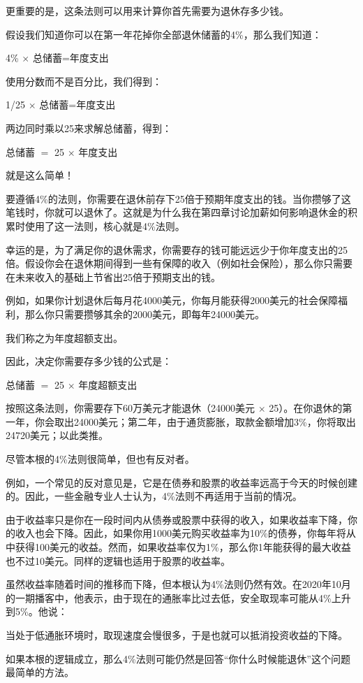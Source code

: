 更重要的是，这条法则可以用来计算你首先需要为退休存多少钱。

假设我们知道你可以在第一年花掉你全部退休储蓄的4\%，那么我们知道：

4\% $\times$ 总储蓄=年度支出

使用分数而不是百分比，我们得到：

1/25 $\times$ 总储蓄=年度支出

两边同时乘以25来求解总储蓄，得到：

总储蓄 $=$ 25 $\times$ 年度支出

就是这么简单！

要遵循4\%的法则，你需要在退休前存下25倍于预期年度支出的钱。当你攒够了这笔钱时，你就可以退休了。这就是为什么我在第四章讨论加薪如何影响退休金的积累时使用了这一法则，核心就是4\%法则。

幸运的是，为了满足你的退休需求，你需要存的钱可能远远少于你年度支出的25倍。假设你会在退休期间得到一些有保障的收入（例如社会保险），那么你只需要在未来收入的基础上节省出25倍于预期支出的钱。

例如，如果你计划退休后每月花4000美元，你每月能获得2000美元的社会保障福利，那么你只需要攒够其余的2000美元，即每年24000美元。

我们称之为年度超额支出。

因此，决定你需要存多少钱的公式是：

总储蓄 $=$ 25 $\times$ 年度超额支出

按照这条法则，你需要存下60万美元才能退休（24000美元 $\times$ 25）。在你退休的第一年，你会取出24000美元；第二年，由于通货膨胀，取款金额增加3\%，你将取出24720美元；以此类推。

尽管本根的4\%法则很简单，但也有反对者。

例如，一个常见的反对意见是，它是在债券和股票的收益率远高于今天的时候创建的。因此，一些金融专业人士认为，4\%法则不再适用于当前的情况。

由于收益率只是你在一段时间内从债券或股票中获得的收入，如果收益率下降，你的收入也会下降。因此，如果你用1000美元购买收益率为10\%的债券，你每年将从中获得100美元的收益。然而，如果收益率仅为1\%，那么你1年能获得的最大收益也不过10美元。同样的逻辑也适用于股票的收益率。

虽然收益率随着时间的推移而下降，但本根认为4\%法则仍然有效。在2020年10月的一期播客中，他表示，由于现在的通胀率比过去低，安全取现率可能从4\%上升到5\%。他说：

当处于低通胀环境时，取现速度会慢很多，于是也就可以抵消投资收益的下降。

如果本根的逻辑成立，那么4\%法则可能仍然是回答“你什么时候能退休”这个问题最简单的方法。

